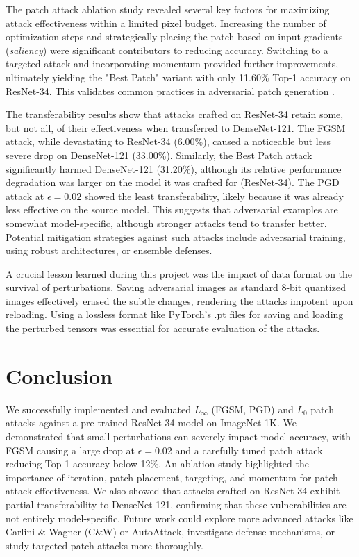 \documentclass[letterpaper]{article}
\begin{document}
The patch attack ablation study revealed several key factors for maximizing attack effectiveness within a limited pixel budget. Increasing the number of optimization steps and strategically placing the patch based on input gradients (\emph{saliency}) were significant contributors to reducing accuracy. Switching to a targeted attack and incorporating momentum provided further improvements, ultimately yielding the "Best Patch" variant with only 11.60\% Top-1 accuracy on ResNet-34. This validates common practices in adversarial patch generation \cite{brown2017adversarial, zoph2019learning}.

The transferability results show that attacks crafted on ResNet-34 retain some, but not all, of their effectiveness when transferred to DenseNet-121. The FGSM attack, while devastating to ResNet-34 (6.00\%), caused a noticeable but less severe drop on DenseNet-121 (33.00\%). Similarly, the Best Patch attack significantly harmed DenseNet-121 (31.20\%), although its relative performance degradation was larger on the model it was crafted for (ResNet-34). The PGD attack at $\epsilon=0.02$ showed the least transferability, likely because it was already less effective on the source model. This suggests that adversarial examples are somewhat model-specific, although stronger attacks tend to transfer better. Potential mitigation strategies against such attacks include adversarial training, using robust architectures, or ensemble defenses.

A crucial lesson learned during this project was the impact of data format on the survival of perturbations. Saving adversarial images as standard 8-bit quantized images effectively erased the subtle changes, rendering the attacks impotent upon reloading. Using a lossless format like PyTorch's .pt files for saving and loading the perturbed tensors was essential for accurate evaluation of the attacks.

\section{Conclusion}
We successfully implemented and evaluated $L_\infty$ (FGSM, PGD) and $L_0$ patch attacks against a pre-trained ResNet-34 model on ImageNet-1K. We demonstrated that small perturbations can severely impact model accuracy, with FGSM causing a large drop at $\epsilon=0.02$ and a carefully tuned patch attack reducing Top-1 accuracy below 12\%. An ablation study highlighted the importance of iteration, patch placement, targeting, and momentum for patch attack effectiveness. We also showed that attacks crafted on ResNet-34 exhibit partial transferability to DenseNet-121, confirming that these vulnerabilities are not entirely model-specific. Future work could explore more advanced attacks like Carlini \& Wagner (C\&W) or AutoAttack, investigate defense mechanisms, or study targeted patch attacks more thoroughly.
\end{document}
